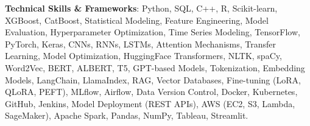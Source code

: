 \item \textbf{Technical Skills \& Frameworks}: Python, SQL, C++, R, Scikit-learn, XGBoost, CatBoost, Statistical Modeling, Feature Engineering, Model Evaluation, Hyperparameter Optimization, Time Series Modeling, TensorFlow, PyTorch, Keras, CNNs, RNNs, LSTMs, Attention Mechanisms, Transfer Learning, Model Optimization, HuggingFace Transformers, NLTK, spaCy, Word2Vec, BERT, ALBERT, T5, GPT-based Models, Tokenization, Embedding Models, LangChain, LlamaIndex, RAG, Vector Databases, Fine-tuning (LoRA, QLoRA, PEFT), MLflow, Airflow, Data Version Control, Docker, Kubernetes, GitHub, Jenkins, Model Deployment (REST APIs), AWS (EC2, S3, Lambda, SageMaker), Apache Spark, Pandas, NumPy, Tableau, Streamlit.


